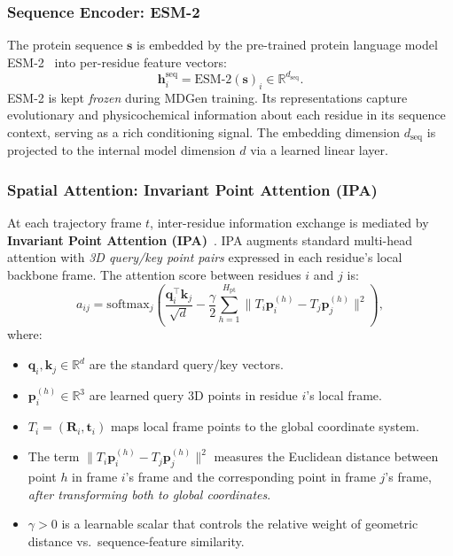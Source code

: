 \documentclass[11pt,a4paper]{article}
\newcommand{\bs}{\mathbf{s}}
\newcommand{\bR}{\mathbf{R}}
\newcommand{\bt}{\mathbf{t}}
\newcommand{\RR}{\mathbb{R}}
\begin{document}
\subsubsection{Sequence Encoder: ESM-2}

The protein sequence $\bs$ is embedded by the pre-trained protein language model
ESM-2~\cite{lin2023} into per-residue feature vectors:
\begin{equation}
  \bm{h}_i^{\text{seq}} = \text{ESM-2}(\bs)_i \in \RR^{d_{\text{seq}}}.
\end{equation}
ESM-2 is kept \emph{frozen} during MDGen training.  Its representations capture evolutionary and
physicochemical information about each residue in its sequence context, serving as a rich
conditioning signal.  The embedding dimension $d_{\text{seq}}$ is projected to the internal
model dimension $d$ via a learned linear layer.

\subsubsection{Spatial Attention: Invariant Point Attention (IPA)}

At each trajectory frame $t$, inter-residue information exchange is mediated by \textbf{Invariant
Point Attention (IPA)}~\cite{jumper2021}.  IPA augments standard multi-head attention with
\emph{3D query/key point pairs} expressed in each residue's local backbone frame.  The attention
score between residues $i$ and $j$ is:
\begin{equation}
  a_{ij} = \text{softmax}_j\!\left(\frac{\bm{q}_i^\top \bm{k}_j}{\sqrt{d}}
  - \frac{\gamma}{2} \sum_{h=1}^{H_{\text{pt}}}
  \|T_i \bm{p}_i^{(h)} - T_j \bm{p}_j^{(h)}\|^2\right),
  \label{eq:ipa}
\end{equation}
where:
\begin{itemize}[leftmargin=2em]
  \item $\bm{q}_i, \bm{k}_j \in \RR^d$ are the standard query/key vectors.
  \item $\bm{p}_i^{(h)} \in \RR^3$ are learned query 3D points in residue $i$'s local frame.
  \item $T_i = (\bR_i, \bt_i)$ maps local frame points to the global coordinate system.
  \item The term $\|T_i \bm{p}_i^{(h)} - T_j \bm{p}_j^{(h)}\|^2$ measures the Euclidean
    distance between point $h$ in frame $i$'s frame and the corresponding point in frame $j$'s
    frame, \emph{after transforming both to global coordinates}.
  \item $\gamma > 0$ is a learnable scalar that controls the relative weight of geometric distance
    vs.\ sequence-feature similarity.
\end{itemize}
\end{document}
